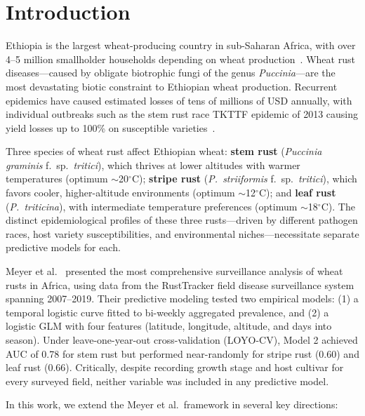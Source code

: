 \documentclass[10pt,twocolumn,letterpaper]{article}
\begin{document}
\section{Introduction}
\label{sec:intro}

Ethiopia is the largest wheat-producing country in sub-Saharan Africa, with over 4--5 million smallholder households depending on wheat production~\cite{meyer2021}. Wheat rust diseases---caused by obligate biotrophic fungi of the genus \textit{Puccinia}---are the most devastating biotic constraint to Ethiopian wheat production. Recurrent epidemics have caused estimated losses of tens of millions of USD annually, with individual outbreaks such as the stem rust race TKTTF epidemic of 2013 causing yield losses up to 100\% on susceptible varieties~\cite{meyer2021}.

Three species of wheat rust affect Ethiopian wheat: \textbf{stem rust} (\textit{Puccinia graminis} f.\ sp.\ \textit{tritici}), which thrives at lower altitudes with warmer temperatures (optimum ${\sim}$20$^\circ$C); \textbf{stripe rust} (\textit{P.\ striiformis} f.\ sp.\ \textit{tritici}), which favors cooler, higher-altitude environments (optimum ${\sim}$12$^\circ$C); and \textbf{leaf rust} (\textit{P.\ triticina}), with intermediate temperature preferences (optimum ${\sim}$18$^\circ$C). The distinct epidemiological profiles of these three rusts---driven by different pathogen races, host variety susceptibilities, and environmental niches---necessitate separate predictive models for each.

Meyer et al.~\cite{meyer2021} presented the most comprehensive surveillance analysis of wheat rusts in Africa, using data from the RustTracker field disease surveillance system spanning 2007--2019. Their predictive modeling tested two empirical models: (1) a temporal logistic curve fitted to bi-weekly aggregated prevalence, and (2) a logistic GLM with four features (latitude, longitude, altitude, and days into season). Under leave-one-year-out cross-validation (LOYO-CV), Model 2 achieved AUC of 0.78 for stem rust but performed near-randomly for stripe rust (0.60) and leaf rust (0.66). Critically, despite recording growth stage and host cultivar for every surveyed field, neither variable was included in any predictive model.

In this work, we extend the Meyer et al.\ framework in several key directions:
\end{document}
